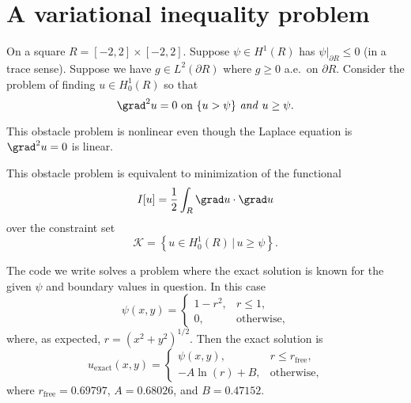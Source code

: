 
\section{A variational inequality problem}

On a square $R = [-2,2]\times [-2,2]$.  Suppose $\psi \in H^1(R)$ has $\psi\big|_{\partial R} \le 0$ (in a trace sense).  Suppose we have $g\in L^2(\partial R)$ where $g \ge 0$ a.e.~on $\partial R$.  Consider the problem of finding $u\in H_0^1(R)$ so that
\begin{equation}
    \grad^2 u = 0 \text{ on } \{u > \psi\} \text{ \emph{and} } u\ge \psi. \label{obstaclestrong}
\end{equation}

This obstacle problem is nonlinear even though the Laplace equation is $\grad^2 u = 0$ is linear.

This obstacle problem is equivalent to minimization of the functional
\begin{equation}
I[u] = \frac{1}{2} \int_R \grad u\cdot \grad u
\end{equation}
over the constraint set
\begin{equation}
\mathcal{K} = \left\{u \in H_0^1(R) \,\Big|\, u\ge \psi\right\}.
\end{equation}

The code we write solves a problem where the exact solution is known for the given $\psi$ and boundary values in question.  In this case
   $$\psi(x,y) = \begin{cases} 1 - r^2, & r \le 1, \\  0, & \text{otherwise},\end{cases}$$
where, as expected, $r = (x^2+y^2)^{1/2}$.%
Then the exact solution is
   $$u_{\text{exact}}(x,y) = \begin{cases} \psi(x,y), & r \le r_{\text{free}}, \\  - A \ln(r) + B, & \text{otherwise},\end{cases}$$
where $r_{\text{free}} = 0.69797$, $A = 0.68026$, and $B = 0.47152$.





